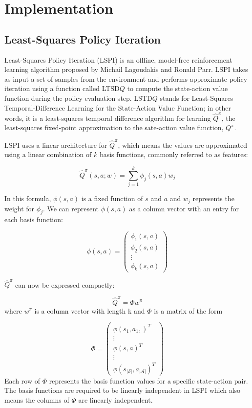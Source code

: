 \chapter{Implementation}

\section{Least-Squares Policy Iteration}

Least-Squares Policy Iteration (LSPI) \cite{lspi} is an offline, model-free reinforcement learning algorithm proposed by Michail Lagoudakis and Ronald Parr. LSPI takes as input a set of samples from the environment and performs approximate policy iteration using a function called LTSD$Q$ to compute the state-action value function during the policy evaluation step. LSTD$Q$ stands for Least-Squares Temporal-Difference Learning for the State-Action Value Function; in other words, it is a least-squares temporal difference algorithm for learning $\hat{Q}^\pi$, the least-squares fixed-point approximation to the sate-action value function, $Q^\pi$.

LSPI uses a linear architecture for $\hat{Q}^\pi$, which means the values are approximated using a linear combination of $k$ basis functions, commonly referred to as features:

\[
    \hat{Q}^\pi(s,a;w) = \sum_{j=1}^k \phi_j(s,a)w_j
\]

In this formula, $\phi(s,a)$ is a fixed function of $s$ and $a$ and $w_j$ represents the weight for $\phi_j$. We can represent $\phi(s,a)$ as a column vector with an entry for each basis function:


\[
    \phi(s,a) = \begin{pmatrix}
       \phi_1(s,a) \\ \phi_2(s,a) \\ \vdots \\ \phi_k(s,a)
    \end{pmatrix}
\]

$\hat{Q}^\pi$  can now be expressed compactly:

\[
    \hat{Q}^\pi = \Phi w^\pi
\]
where $w^\pi$ is a column vector with length k and $\Phi$ is a matrix of the form

\[
    \Phi = \begin{pmatrix}
        \phi(s_1,a_1,)^T \\ \vdots \\ \phi(s,a)^T \\ \vdots \\ \phi(s_{|\mathcal{S}|},a_{|\mathcal{A}|})^T
    \end{pmatrix}
\]
Each row of $\Phi$ represents the basis function values for a specific state-action pair. The basis functions are required to be linearly independent in LSPI which also means the columns of $\Phi$ are linearly independent.

